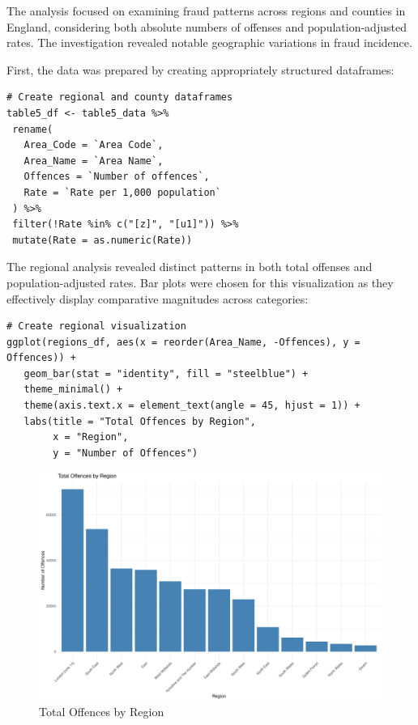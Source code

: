 \documentclass{article}
\begin{document}
The analysis focused on examining fraud patterns across regions and counties in England, considering both absolute numbers of offenses and population-adjusted rates. The investigation revealed notable geographic variations in fraud incidence.

First, the data was prepared by creating appropriately structured dataframes:

\begin{lstlisting}[style=RStyle, caption={Data Preparation and Structure}]
# Create regional and county dataframes
table5_df <- table5_data %>%
 rename(
   Area_Code = `Area Code`,
   Area_Name = `Area Name`,
   Offences = `Number of offences`,
   Rate = `Rate per 1,000 population`
 ) %>%
 filter(!Rate %in% c("[z]", "[u1]")) %>%
 mutate(Rate = as.numeric(Rate))
\end{lstlisting}

The regional analysis revealed distinct patterns in both total offenses and population-adjusted rates. Bar plots were chosen for this visualization as they effectively display comparative magnitudes across categories:

\begin{lstlisting}[style=RStyle, caption={Regional Visualization Code}]
# Create regional visualization
ggplot(regions_df, aes(x = reorder(Area_Name, -Offences), y = Offences)) +
   geom_bar(stat = "identity", fill = "steelblue") +
   theme_minimal() +
   theme(axis.text.x = element_text(angle = 45, hjust = 1)) +
   labs(title = "Total Offences by Region",
        x = "Region",
        y = "Number of Offences")
\end{lstlisting}

\begin{figure}[H]
   \centering
   \includegraphics[width=0.7\linewidth]{Images/Plot4.png}
   \caption{Total Offences by Region}
   \label{fig:regional_offences}
\end{figure}
\end{document}
